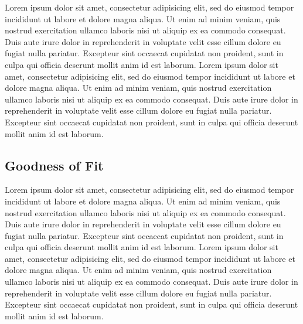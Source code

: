		Lorem ipsum dolor sit amet, consectetur adipisicing elit, sed do eiusmod
		tempor incididunt ut labore et dolore magna aliqua. Ut enim ad minim veniam,
		quis nostrud exercitation ullamco laboris nisi ut aliquip ex ea commodo
		consequat. Duis aute irure dolor in reprehenderit in voluptate velit esse
		cillum dolore eu fugiat nulla pariatur. Excepteur sint occaecat cupidatat non
		proident, sunt in culpa qui officia deserunt mollit anim id est laborum.
		Lorem ipsum dolor sit amet, consectetur adipisicing elit, sed do eiusmod
		tempor incididunt ut labore et dolore magna aliqua. Ut enim ad minim veniam,
		quis nostrud exercitation ullamco laboris nisi ut aliquip ex ea commodo
		consequat. Duis aute irure dolor in reprehenderit in voluptate velit esse
		cillum dolore eu fugiat nulla pariatur. Excepteur sint occaecat cupidatat non
		proident, sunt in culpa qui officia deserunt mollit anim id est laborum.
	

	\subsection{Goodness of Fit}
	\label{ssec:suitability}
	
		Lorem ipsum dolor sit amet, consectetur adipisicing elit, sed do eiusmod
		tempor incididunt ut labore et dolore magna aliqua. Ut enim ad minim veniam,
		quis nostrud exercitation ullamco laboris nisi ut aliquip ex ea commodo
		consequat. Duis aute irure dolor in reprehenderit in voluptate velit esse
		cillum dolore eu fugiat nulla pariatur. Excepteur sint occaecat cupidatat non
		proident, sunt in culpa qui officia deserunt mollit anim id est laborum.
		Lorem ipsum dolor sit amet, consectetur adipisicing elit, sed do eiusmod
		tempor incididunt ut labore et dolore magna aliqua. Ut enim ad minim veniam,
		quis nostrud exercitation ullamco laboris nisi ut aliquip ex ea commodo
		consequat. Duis aute irure dolor in reprehenderit in voluptate velit esse
		cillum dolore eu fugiat nulla pariatur. Excepteur sint occaecat cupidatat non
		proident, sunt in culpa qui officia deserunt mollit anim id est laborum.
	

